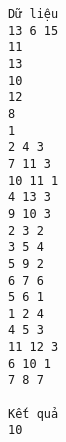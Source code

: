 \begin{verbatim}
Dữ liệu
13 6 15
11
13
10
12
8
1
2 4 3
7 11 3
10 11 1
4 13 3
9 10 3
2 3 2
3 5 4
5 9 2
6 7 6
5 6 1
1 2 4
4 5 3
11 12 3
6 10 1
7 8 7

Kết quả
10
\end{verbatim}